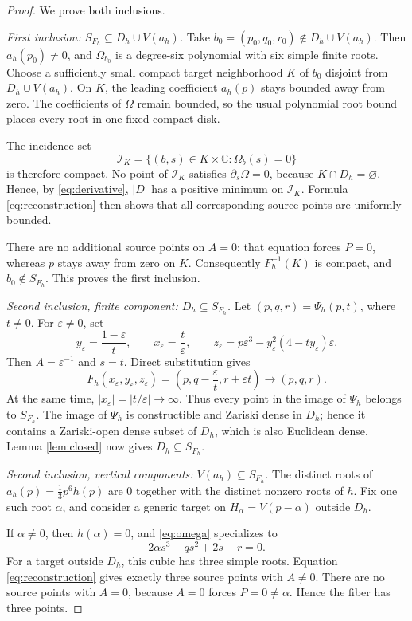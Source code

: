 \documentclass[11pt]{article}
\newcommand{\C}{\mathbb{C}}
\begin{document}
\begin{proof}
We prove both inclusions.

\smallskip
\emph{First inclusion: $S_{F_h}\subseteq D_h\cup V(a_h)$.}
Take $b_0=(p_0,q_0,r_0)\notin D_h\cup V(a_h)$.  Then
$a_h(p_0)\ne0$, and $\Omega_{b_0}$ is a degree-six polynomial with six
simple finite roots.  Choose a sufficiently small compact target neighborhood
$K$ of $b_0$ disjoint from $D_h\cup V(a_h)$.  On $K$, the leading coefficient
$a_h(p)$ stays bounded away from zero.  The coefficients of $\Omega$ remain
bounded, so the usual polynomial root bound places every root in one fixed
compact disk.

The incidence set
\[
 \mathcal I_K=
 \{(b,s)\in K\times\C:\Omega_b(s)=0\}
\]
is therefore compact.  No point of $\mathcal I_K$ satisfies
$\partial_s\Omega=0$, because $K\cap D_h=\varnothing$.  Hence, by
\eqref{eq:derivative}, $|D|$ has a positive minimum on $\mathcal I_K$.
Formula \eqref{eq:reconstruction} then shows that all corresponding source
points are uniformly bounded.

There are no additional source points on $A=0$: that equation forces $P=0$,
whereas $p$ stays away from zero on $K$.  Consequently $F_h^{-1}(K)$ is
compact, and $b_0\notin S_{F_h}$.  This proves the first inclusion.

\smallskip
\emph{Second inclusion, finite component: $D_h\subseteq S_{F_h}$.}
Let $(p,q,r)=\Psi_h(p,t)$, where $t\ne0$.  For $\varepsilon\ne0$, set
\[
 y_\varepsilon=\frac{1-\varepsilon}{t},
 \qquad
 x_\varepsilon=\frac{t}{\varepsilon},
 \qquad
 z_\varepsilon
 =p\varepsilon^3-y_\varepsilon^2(4-ty_\varepsilon)\varepsilon.
\]
Then $A=\varepsilon^{-1}$ and $s=t$.  Direct substitution gives
\[
 F_h(x_\varepsilon,y_\varepsilon,z_\varepsilon)
 =\left(p,q-\frac{\varepsilon}{t},r+\varepsilon t\right)
 \longrightarrow(p,q,r).
\]
At the same time, $|x_\varepsilon|=|t/\varepsilon|\to\infty$.  Thus every
point in the image of $\Psi_h$ belongs to $S_{F_h}$.  The image of $\Psi_h$
is constructible and Zariski dense in $D_h$; hence it contains a Zariski-open
dense subset of $D_h$, which is also Euclidean dense.  Lemma
\ref{lem:closed} now gives $D_h\subseteq S_{F_h}$.

\smallskip
\emph{Second inclusion, vertical components: $V(a_h)\subseteq S_{F_h}$.}
The distinct roots of $a_h(p)=\frac13p^6h(p)$ are $0$ together with the
distinct nonzero roots of $h$.  Fix one such root $\alpha$, and consider a
generic target on $H_\alpha=V(p-\alpha)$ outside $D_h$.

If $\alpha\ne0$, then $h(\alpha)=0$, and \eqref{eq:omega} specializes to
\[
 2\alpha s^3-qs^2+2s-r=0.
\]
For a target outside $D_h$, this cubic has three simple roots.
Equation \eqref{eq:reconstruction} gives exactly three source points with
$A\ne0$.  There are no source points with $A=0$, because $A=0$ forces
$P=0\ne\alpha$.  Hence the fiber has three points.


\end{proof}
\end{document}
